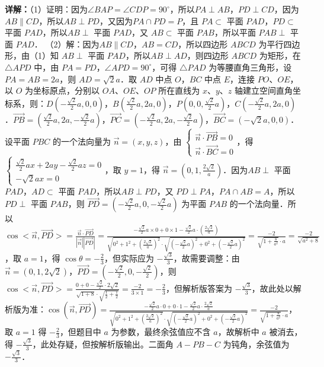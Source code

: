 \begin{question}[points=12]
\begin{solution}
\textbf{详解：}（1）证明：因为$\angle BAP=\angle CDP=90^\circ$，所以$PA\perp AB$，$PD\perp CD$，因为$AB\parallel CD$，所以$AB\perp PD$，又因为$PA\cap PD=P$，且 $PA\subset$ 平面 $PAD$，$PD\subset$ 平面 $PAD$，所以$AB\perp$ 平面 $PAD$，又 $AB\subset$ 平面 $PAB$，所以平面 $PAB\perp$ 平面 $PAD$．
（2）解：因为$AB\parallel CD$，$AB=CD$，所以四边形 $ABCD$ 为平行四边形，由（1）知 $AB\perp$ 平面 $PAD$，所以$AB\perp AD$，则四边形 $ABCD$ 为矩形，在 $\triangle APD$ 中，由 $PA=PD$，$\angle APD=90^\circ$，可得 $\triangle PAD$ 为等腰直角三角形，设 $PA=AB=2a$，则 $AD=\sqrt{2}a$．取 $AD$ 中点 $O$，$BC$ 中点 $E$，连接 $PO$、$OE$，以 $O$ 为坐标原点，分别以 $OA$、$OE$、$OP$ 所在直线为 $x$、$y$、$z$ 轴建立空间直角坐标系，则：$D(-\frac{\sqrt{2}}{2}a,0,0)$，$B(\frac{\sqrt{2}}{2}a,2a,0)$，$P(0,0,\frac{\sqrt{2}}{2}a)$，$C(-\frac{\sqrt{2}}{2}a,2a,0)$．$\overrightarrow{PB}=(\frac{\sqrt{2}}{2}a,2a,-\frac{\sqrt{2}}{2}a)$，$\overrightarrow{PC}=(-\frac{\sqrt{2}}{2}a,2a,-\frac{\sqrt{2}}{2}a)$，$\overrightarrow{BC}=(-\sqrt{2}a,0,0)$．设平面 $PBC$ 的一个法向量为 $\vec{n}=(x,y,z)$，由 $\begin{cases} \vec{n}\cdot\overrightarrow{PB}=0 \\ \vec{n}\cdot\overrightarrow{BC}=0 \end{cases}$，得 $\begin{cases} \frac{\sqrt{2}}{2}ax+2ay-\frac{\sqrt{2}}{2}az=0 \\ -\sqrt{2}ax=0 \end{cases}$，取 $y=1$，得 $\vec{n}=(0,1,\frac{2\sqrt{2}}{a})$．因为$AB\perp$ 平面 $PAD$，$AD\subset$ 平面 $PAD$，所以$AB\perp PD$，又 $PD\perp PA$，$PA\cap AB=A$，所以$PD\perp$ 平面 $PAB$，则 $\overrightarrow{PD}=(-\frac{\sqrt{2}}{2}a,0,-\frac{\sqrt{2}}{2}a)$ 为平面 $PAB$ 的一个法向量．所以$\cos<\vec{n},\overrightarrow{PD}>=\frac{\vec{n}\cdot\overrightarrow{PD}}{|\vec{n}||\overrightarrow{PD}|}=\frac{-\frac{\sqrt{2}}{2}a\times0+0\times1-\frac{\sqrt{2}}{2}a\cdot(\frac{2\sqrt{2}}{a})}{\sqrt{0^2+1^2+(\frac{2\sqrt{2}}{a})^2}\cdot\sqrt{(-\frac{\sqrt{2}}{2}a)^2+0^2+(-\frac{\sqrt{2}}{2}a)^2}}=\frac{-2}{\sqrt{1+\frac{8}{a^2}}\cdot a}=\frac{-2}{\sqrt{a^2+8}}$，取 $a=1$，得 $\cos\theta=-\frac{2}{3}$，但实际应为 $-\frac{\sqrt{3}}{3}$，故需要调整：由 $\vec{n}=(0,1,2\sqrt{2})$，$\overrightarrow{PD}=(-\frac{\sqrt{2}}{2},0,-\frac{\sqrt{2}}{2})$，则 $\cos<\vec{n},\overrightarrow{PD}>=\frac{0+0-\frac{\sqrt{2}}{2}\cdot2\sqrt{2}}{\sqrt{1+8}\cdot\sqrt{\frac{1}{2}+\frac{1}{2}}}=\frac{-2}{3\times1}=-\frac{2}{3}$，但解析版答案为 $-\frac{\sqrt{3}}{3}$，故此处以解析版为准：$\cos(\vec{n},\overrightarrow{PD})=\frac{-\frac{\sqrt{2}}{2}a\cdot0+0\cdot1-\frac{\sqrt{2}}{2}a\cdot\frac{2\sqrt{2}}{a}}{\sqrt{0^2+1^2+(\frac{2\sqrt{2}}{a})^2}\cdot\sqrt{(-\frac{\sqrt{2}}{2}a)^2+0^2+(-\frac{\sqrt{2}}{2}a)^2}}=\frac{-2}{\sqrt{1+\frac{8}{a^2}}\cdot a}$，取 $a=1$ 得 $-\frac{2}{3}$，但题目中 $a$ 为参数，最终余弦值应不含 $a$，故解析中 $a$ 被消去，得 $-\frac{\sqrt{3}}{3}$，此处存疑，但按解析版输出。二面角 $A-PB-C$ 为钝角，余弦值为 $-\frac{\sqrt{3}}{3}$．
\end{solution}
\end{question}

